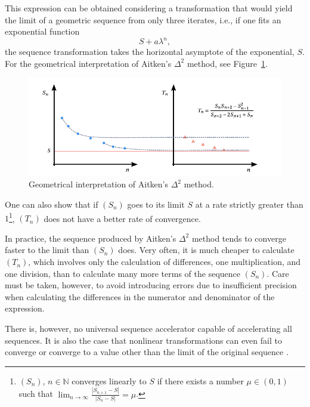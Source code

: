 This expression can be obtained considering a transformation that would yield the limit of a geometric sequence from only three iterates, i.e., if one fits an exponential function
\begin{equation}
  S + a \lambda^n,
\end{equation}
the sequence transformation takes the horizontal asymptote of the exponential, \(S\).
For the geometrical interpretation of Aitken's \(\Delta^2\) method, see Figure~\ref{fig:aitken}.

\begin{figure}[htbp]
  \includegraphics{figures/aitken}
  \caption{Geometrical interpretation of Aitken's \(\Delta^2\) method.}
  \label{fig:aitken}
\end{figure}

One can also show that if \((S_n)\) goes to its limit \(S\) at a rate strictly greater than \(1\)\footnote{$(S_{n})$, ${n \in \mathbb{N}}$ converges linearly to $S$ if there exists a number $\mu \in(0,1)$ such that \(\lim_{n \rightarrow \infty} \frac{\left|S_{n+1}-S\right|}{\left|S_{n}-S\right|}=\mu\).}, \((T_n)\) does not have a better rate of convergence.

In practice, the sequence produced by Aitken's \(\Delta^2\) method tends to converge faster to the limit than \((S_n)\) does.
Very often, it is much cheaper to calculate \((T_n)\), which involves only the calculation of differences, one multiplication, and one division, than to calculate many more terms of the sequence \((S_n)\).
Care must be taken, however, to avoid introducing errors due to insufficient precision when calculating the differences in the numerator and denominator of the expression.

There is, however, no universal sequence accelerator capable of accelerating all sequences.
It is also the case that nonlinear transformations can even fail to converge or converge to a value other than the limit of the original sequence \citep{brezinski_extrapolation_2013}.

